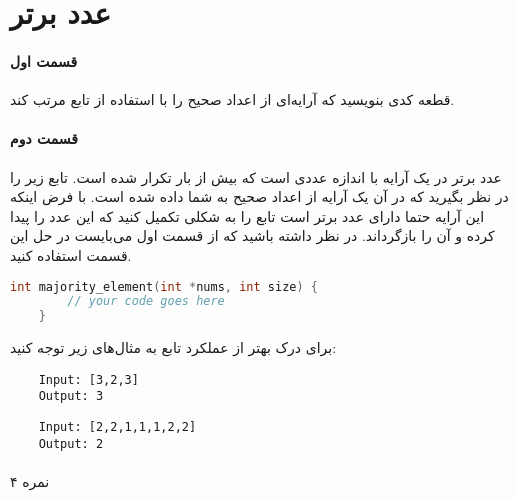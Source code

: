 \documentclass[../main.tex]{subfiles}
\begin{document}
\section{عدد برتر}
\paragraph{قسمت اول}
قطعه کدی بنویسید که آرایه‌ای از اعداد صحیح را با استفاده از تابع
مرتب کند.

\paragraph{قسمت دوم}
عدد برتر در یک آرایه با اندازه 
عددی است که بیش از 
بار تکرار شده است.
تابع زیر را در نظر بگیرید که در آن یک آرایه از اعداد صحیح به شما داده شده است. با فرض اینکه این آرایه حتما دارای عدد برتر است تابع را به شکلی تکمیل کنید که
این عدد را پیدا کرده و آن را بازگرداند.
در نظر داشته باشید که از قسمت اول می‌بایست در حل این قسمت استفاده کنید.

\begin{latin}
\begin{lstlisting}[language=c]
    int majority_element(int *nums, int size) {
        // your code goes here
    }
\end{lstlisting}
\end{latin}

برای درک بهتر از عملکرد تابع به مثال‌های زیر توجه کنید:

\begin{latin}
\begin{verbatim}
    Input: [3,2,3]
    Output: 3
\end{verbatim}

\begin{verbatim}
    Input: [2,2,1,1,1,2,2]
    Output: 2
\end{verbatim}
\end{latin}

\paragraph{}
۴ نمره
\end{document}
